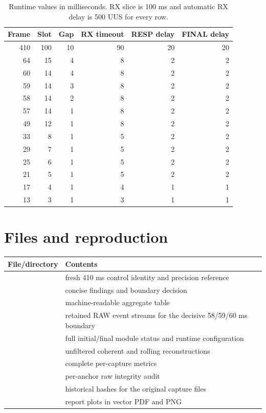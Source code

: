 \documentclass[11pt,a4paper]{article}
\begin{document}
\begin{table}[H]
  \centering
  \small
  \begin{tabular}{rrrrrr}
    \toprule
    Frame & Slot & Gap & RX timeout & RESP delay & FINAL delay\\
    \midrule
    410 & 100 & 10 & 90 & 20 & 20\\
    64 & 15 & 4 & 8 & 2 & 2\\
    60 & 14 & 4 & 8 & 2 & 2\\
    59 & 14 & 3 & 8 & 2 & 2\\
    58 & 14 & 2 & 8 & 2 & 2\\
    57 & 14 & 1 & 8 & 2 & 2\\
    49 & 12 & 1 & 8 & 2 & 2\\
    33 & 8 & 1 & 5 & 2 & 2\\
    29 & 7 & 1 & 5 & 2 & 2\\
    25 & 6 & 1 & 5 & 2 & 2\\
    21 & 5 & 1 & 5 & 2 & 2\\
    17 & 4 & 1 & 4 & 1 & 1\\
    13 & 3 & 1 & 3 & 1 & 1\\
    \bottomrule
  \end{tabular}
  \caption{Runtime values in milliseconds. RX slice is 100 ms and automatic
  RX delay is 500 UUS for every row.}
\end{table}

\section{Files and reproduction}

\small
\begin{tabularx}{\textwidth}{p{62mm}Y}
  \toprule
  File/directory & Contents\\
  \midrule
   & fresh 410 ms control identity and precision reference\\
   & concise findings and boundary decision\\
   & machine-readable aggregate table\\
   & retained RAW event streams
  for the decisive 58/59/60 ms boundary\\
   & full initial/final module status and runtime
  configuration\\
   & unfiltered coherent and rolling reconstructions\\
   & complete per-capture metrics\\
   & per-anchor raw integrity audit\\
   & historical hashes for the original capture files\\
   & report plots in vector PDF and PNG\\
  \bottomrule
\end{tabularx}
\end{document}

